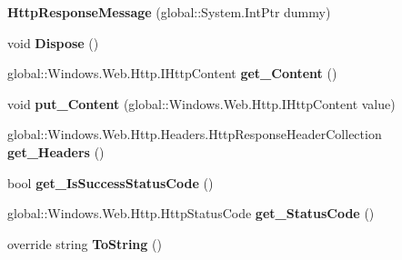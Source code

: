 \begin{DoxyCompactItemize}
\mbox{\label{class_windows_1_1_web_1_1_http_1_1_http_response_message_abf9eacfb0122fbb37c4cefbe6027c1bb}} 
{\bfseries Http\+Response\+Message} (global\+::\+System.\+Int\+Ptr dummy)
\item 
\mbox{\label{class_windows_1_1_web_1_1_http_1_1_http_response_message_a79ea29d0bc40d8bc64102d96f59aebf4}} 
void {\bfseries Dispose} ()
\item 
\mbox{\label{class_windows_1_1_web_1_1_http_1_1_http_response_message_aa742acc5e70c1d817b438ea41be4de12}} 
global\+::\+Windows.\+Web.\+Http.\+I\+Http\+Content {\bfseries get\+\_\+\+Content} ()
\item 
\mbox{\label{class_windows_1_1_web_1_1_http_1_1_http_response_message_a3cb8022988b8e1a2586f7a102281c88c}} 
void {\bfseries put\+\_\+\+Content} (global\+::\+Windows.\+Web.\+Http.\+I\+Http\+Content value)
\item 
\mbox{\label{class_windows_1_1_web_1_1_http_1_1_http_response_message_aaca34cdc610c5bae128167860b27d451}} 
global\+::\+Windows.\+Web.\+Http.\+Headers.\+Http\+Response\+Header\+Collection {\bfseries get\+\_\+\+Headers} ()
\item 
\mbox{\label{class_windows_1_1_web_1_1_http_1_1_http_response_message_a91963a9e973727c0e5c97fcc0ead8060}} 
bool {\bfseries get\+\_\+\+Is\+Success\+Status\+Code} ()
\item 
\mbox{\label{class_windows_1_1_web_1_1_http_1_1_http_response_message_a559b5594bd74d83fdc6617968b8a0d95}} 
global\+::\+Windows.\+Web.\+Http.\+Http\+Status\+Code {\bfseries get\+\_\+\+Status\+Code} ()
\item 
\mbox{\label{class_windows_1_1_web_1_1_http_1_1_http_response_message_a41a46b8ee759bbf5b15b954f928eb816}} 
override string {\bfseries To\+String} ()

\end{DoxyCompactItemize}
